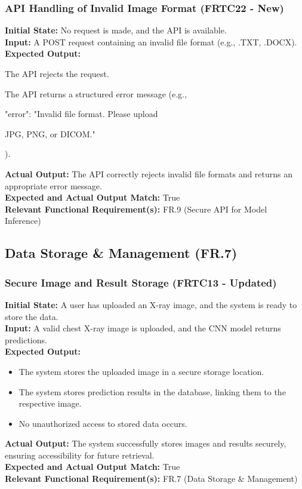 \documentclass[12pt, titlepage]{article}
\begin{document}
\subsubsection{API Handling of Invalid Image Format (FRTC22 - New)}
\textbf{Initial State:} No request is made, and the API is available.\\
\textbf{Input:} A POST request containing an invalid file format (e.g., .TXT, .DOCX).\\
\textbf{Expected Output:}
\begin{itemize}
\item The API rejects the request.
\item The API returns a structured error message (e.g., { "error": "Invalid file format. Please upload \item JPG, PNG, or DICOM." }).
\end{itemize}
\textbf{Actual Output:} The API correctly rejects invalid file formats and returns an appropriate error message.\\
\textbf{Expected and Actual Output Match:} True\\
\textbf{Relevant Functional Requirement(s):} FR.9 (Secure API for Model Inference)\\

\subsection{Data Storage \& Management (FR.7)}
\subsubsection{Secure Image and Result Storage (FRTC13 - Updated)}
\textbf{Initial State:} A user has uploaded an X-ray image, and the system is ready to store the data.\\
\textbf{Input:} A valid chest X-ray image is uploaded, and the CNN model returns predictions.\\
\textbf{Expected Output:}
\begin{itemize}
\item The system stores the uploaded image in a secure storage location.
\item The system stores prediction results in the database, linking them to the respective image.
\item No unauthorized access to stored data occurs.
\end{itemize}
\textbf{Actual Output:} The system successfully stores images and results securely, ensuring accessibility for future retrieval.\\
\textbf{Expected and Actual Output Match:} True\\
\textbf{Relevant Functional Requirement(s):} FR.7 (Data Storage \& Management)
\end{document}

